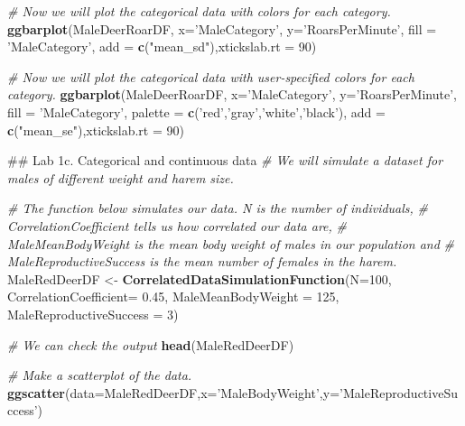 \documentclass[]{book}
\newenvironment{Shaded}{\begin{snugshade}}{\end{snugshade}}
\newcommand{\CommentTok}[1]{\textcolor[rgb]{0.56,0.35,0.01}{\textit{#1}}}
\newcommand{\DataTypeTok}[1]{\textcolor[rgb]{0.13,0.29,0.53}{#1}}
\newcommand{\DecValTok}[1]{\textcolor[rgb]{0.00,0.00,0.81}{#1}}
\newcommand{\FloatTok}[1]{\textcolor[rgb]{0.00,0.00,0.81}{#1}}
\newcommand{\KeywordTok}[1]{\textcolor[rgb]{0.13,0.29,0.53}{\textbf{#1}}}
\newcommand{\NormalTok}[1]{#1}
\newcommand{\StringTok}[1]{\textcolor[rgb]{0.31,0.60,0.02}{#1}}
\begin{document}
\begin{Shaded}
\begin{Highlighting}[]
\CommentTok{# Now we will plot the categorical data with colors for each category.}
\KeywordTok{ggbarplot}\NormalTok{(MaleDeerRoarDF, }\DataTypeTok{x=}\StringTok{'MaleCategory'}\NormalTok{, }\DataTypeTok{y=}\StringTok{'RoarsPerMinute'}\NormalTok{, }\DataTypeTok{fill =} \StringTok{'MaleCategory'}\NormalTok{,}
          \DataTypeTok{add =} \KeywordTok{c}\NormalTok{(}\StringTok{"mean_sd"}\NormalTok{),}\DataTypeTok{xtickslab.rt =} \DecValTok{90}\NormalTok{)}

\CommentTok{# Now we will plot the categorical data with user-specified colors for each category.}
\KeywordTok{ggbarplot}\NormalTok{(MaleDeerRoarDF, }\DataTypeTok{x=}\StringTok{'MaleCategory'}\NormalTok{, }\DataTypeTok{y=}\StringTok{'RoarsPerMinute'}\NormalTok{, }\DataTypeTok{fill =} \StringTok{'MaleCategory'}\NormalTok{,}
          \DataTypeTok{palette =} \KeywordTok{c}\NormalTok{(}\StringTok{'red'}\NormalTok{,}\StringTok{'gray'}\NormalTok{,}\StringTok{'white'}\NormalTok{,}\StringTok{'black'}\NormalTok{),}
          \DataTypeTok{add =} \KeywordTok{c}\NormalTok{(}\StringTok{"mean_se"}\NormalTok{),}\DataTypeTok{xtickslab.rt =} \DecValTok{90}\NormalTok{)}


\NormalTok{## Lab 1c. Categorical and continuous data}
\CommentTok{# We will simulate a dataset for males of different weight and harem size.}

\CommentTok{# The function below simulates our data. N is the number of individuals,   }
\CommentTok{# CorrelationCoefficient tells us how correlated our data are,  }
\CommentTok{# MaleMeanBodyWeight is the mean body weight of males in our population and }
\CommentTok{# MaleReproductiveSuccess is the mean number of females in the harem.}
\NormalTok{MaleRedDeerDF <-}\StringTok{ }\KeywordTok{CorrelatedDataSimulationFunction}\NormalTok{(}\DataTypeTok{N=}\DecValTok{100}\NormalTok{, }
                                                  \DataTypeTok{CorrelationCoefficient=} \FloatTok{0.45}\NormalTok{,}
                                                  \DataTypeTok{MaleMeanBodyWeight =} \DecValTok{125}\NormalTok{,}
                                                  \DataTypeTok{MaleReproductiveSuccess =} \DecValTok{3}\NormalTok{)}

\CommentTok{# We can check the output}
\KeywordTok{head}\NormalTok{(MaleRedDeerDF)}

\CommentTok{# Make a scatterplot of the data.}
\KeywordTok{ggscatter}\NormalTok{(}\DataTypeTok{data=}\NormalTok{MaleRedDeerDF,}\DataTypeTok{x=}\StringTok{'MaleBodyWeight'}\NormalTok{,}\DataTypeTok{y=}\StringTok{'MaleReproductiveSuccess'}\NormalTok{)}


\end{Highlighting}
\end{Shaded}
\end{document}
